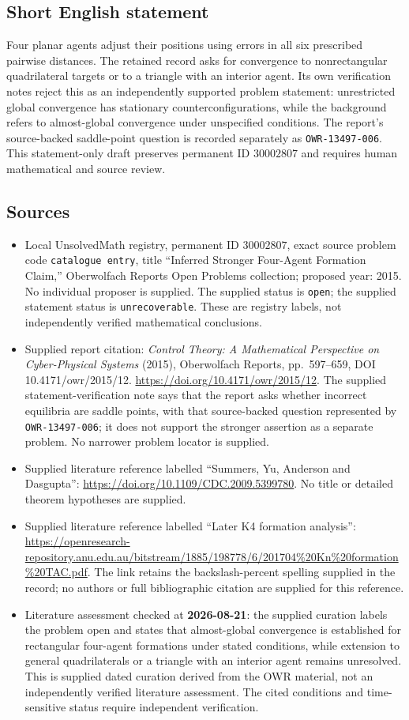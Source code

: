 \documentclass[11pt]{article}
\begin{document}
\subsection{Short English statement}
Four planar agents adjust their positions using errors in all six prescribed pairwise distances. The retained record asks for convergence to nonrectangular quadrilateral targets or to a triangle with an interior agent. Its own verification notes reject this as an independently supported problem statement: unrestricted global convergence has stationary counterconfigurations, while the background refers to almost-global convergence under unspecified conditions. The report's source-backed saddle-point question is recorded separately as \texttt{OWR-13497-006}. This statement-only draft preserves permanent ID \(30002807\) and requires human mathematical and source review.
\subsection{Sources}
\begin{itemize}
\item Local UnsolvedMath registry, permanent ID \(30002807\), exact source problem code \texttt{catalogue entry}, title ``Inferred Stronger Four-Agent Formation Claim,'' Oberwolfach Reports Open Problems collection; proposed year: 2015. No individual proposer is supplied. The supplied status is \texttt{open}; the supplied statement status is \texttt{unrecoverable}. These are registry labels, not independently verified mathematical conclusions.
\item Supplied report citation: \emph{Control Theory: A Mathematical Perspective on Cyber-Physical Systems} (2015), Oberwolfach Reports, pp.\ 597--659, DOI 10.4171/owr/2015/12. \url{https://doi.org/10.4171/owr/2015/12}. The supplied statement-verification note says that the report asks whether incorrect equilibria are saddle points, with that source-backed question represented by \texttt{OWR-13497-006}; it does not support the stronger assertion as a separate problem. No narrower problem locator is supplied.
\item Supplied literature reference labelled ``Summers, Yu, Anderson and Dasgupta'': \url{https://doi.org/10.1109/CDC.2009.5399780}. No title or detailed theorem hypotheses are supplied.
\item Supplied literature reference labelled ``Later K4 formation analysis'': \url{https://openresearch-repository.anu.edu.au/bitstream/1885/198778/6/201704\%20Kn\%20formation\%20TAC.pdf}. The link retains the backslash-percent spelling supplied in the record; no authors or full bibliographic citation are supplied for this reference.
\item Literature assessment checked at \textbf{2026-08-21}: the supplied curation labels the problem open and states that almost-global convergence is established for rectangular four-agent formations under stated conditions, while extension to general quadrilaterals or a triangle with an interior agent remains unresolved. This is supplied dated curation derived from the OWR material, not an independently verified literature assessment. The cited conditions and time-sensitive status require independent verification.
\end{itemize}
\end{document}
